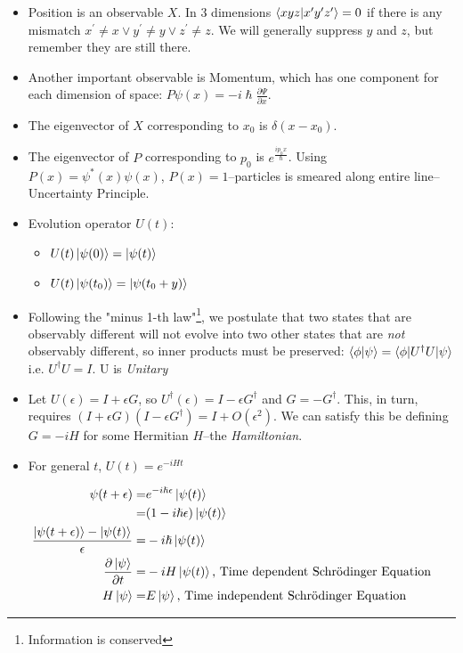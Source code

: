 \documentclass[]{article}
\begin{document}
\begin{itemize}
\begin{itemize}
		\item Position is an observable $X$. In 3 dimensions $\braket{xyz|x^{\prime}y^{\prime}z^{\prime}}=0$ if there is any mismatch $x^{\prime}\ne x \lor y^{\prime} \ne y \lor z^{\prime} \ne z$. We will generally suppress $y$ and $z$, but remember they are still there.
		\item Another important observable is Momentum, which has one component for each dimension of space: $P\psi(x)=- i \hslash \frac{\partial \Psi}{\partial x}$.
		\item The eigenvector of $X$ corresponding to $x_0$ is $\delta(x-x_0)$.
		\item The eigenvector of $P$ corresponding to $p_0$ is $e^{\frac{i p_0 x}{\hslash}}$. Using $P(x)=\psi^*(x)\psi(x)$, $P(x)=1$--particles is smeared along entire line--Uncertainty Principle.
	\end{itemize}
\end{itemize}

\begin{itemize}
	\item Evolution operator $U(t)$:
	\begin{itemize}
		\item $U(t)\ket{\psi(0)} = \ket{\psi(t)}$
		\item $U(t)\ket{\psi(t_0)} = \ket{\psi(t_0 + y)}$
	\end{itemize}
	\item Following the "minus 1-th law"\footnote{Information is conserved}, we postulate that two states that are observably different will not evolve into two other states that are \emph{not} observably different, so inner products must be preserved: $\braket{\phi|\psi} = \braket{\phi|U^{\dagger}U|\psi}$ i.e. $U^{\dagger}U=I$. U is \emph{Unitary}
	\item Let $U(\epsilon)= I + \epsilon G$, so $U^\dagger(\epsilon)= I - \epsilon G^\dagger$ and $G=-G^{\dagger}$. This, in turn, requires $( I + \epsilon G)( I - \epsilon G^\dagger)= I + O(\epsilon^2)$. We can satisfy this be defining $G=- i H$ for some Hermitian $H$--the \emph{Hamiltonian}.
	\item For general $t$, $U(t)=e^{- i H t}$
\end{itemize}
\begin{align*}
	\psi(t+\epsilon) =& e^{-i \hslash \epsilon} \ket{\psi(t)}\\
	=& (1- i \hslash \epsilon)\ket{\psi(t)}\\
	\frac{\ket{\psi(t+\epsilon)} -\ket{\psi(t)} }{\epsilon}=& -i \hslash \ket{\psi(t)}\\
	\frac{\partial \ket{\psi}}{\partial t} =& -i H \ket{\psi(t)} \text{, Time dependent Schr\"odinger Equation}\\
	H \ket{\psi} =& E \ket{\psi}\text{, Time independent Schr\"odinger Equation}
\end{align*} 
\end{document}

